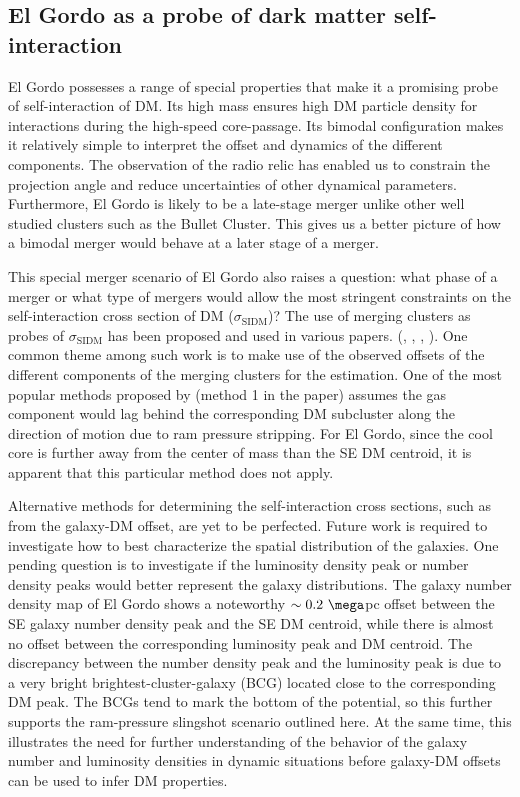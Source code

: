 \subsection{El Gordo as a probe of dark matter self-interaction}
El Gordo possesses a range of special properties that make it a promising
probe of self-interaction of DM. Its high mass ensures high DM
particle density for interactions during the high-speed core-passage. Its bimodal configuration makes it
relatively simple to interpret the offset and dynamics of the different
components. The observation of the radio relic has enabled us to
constrain the projection angle and reduce uncertainties of other dynamical
parameters. Furthermore, El Gordo is likely to be a late-stage merger
unlike other well studied clusters such as the Bullet Cluster. This gives
us a better picture of how a bimodal merger would behave at a later stage of a merger. \par 
This special merger scenario of El Gordo also raises a question: what phase
of a merger or what type of mergers would allow the most stringent
constraints on the self-interaction cross section of DM ($\sigma_{\text{SIDM}}$)? 
The use of merging clusters as probes of $\sigma_{\text{SIDM}}$ 
has been proposed and used in various papers.
(\citealt{Markevitch2004}, \citealt{Randall2008d}, \citealt{Merten2011},
\citealt{Dawson12}). One common theme among such work is
to make use of the observed offsets of the different components of the
merging clusters for the estimation. One of the most popular methods proposed by
\citealt{Markevitch2004} (method 1 in the paper) assumes the gas component would lag behind the corresponding DM
subcluster along the direction of motion due to ram pressure stripping.   
For El Gordo, since the cool core is further away from the
center of mass than the SE DM centroid, it is apparent that this particular
method does not apply.\par 
Alternative methods for determining the self-interaction cross sections,
such as from the galaxy-DM offset, are yet to be perfected. Future work is
required to investigate how to best characterize the spatial distribution
of the galaxies. One pending question is to investigate if the luminosity
density peak or number density peaks would better represent the galaxy
distributions. The galaxy number density map of El Gordo
 shows a noteworthy $\sim0.2~\mega$pc offset between the SE
galaxy number density peak and the SE DM centroid, while there is almost no offset
between the corresponding luminosity peak and DM centroid. The discrepancy
between the number density peak and the luminosity peak is due to a very
bright brightest-cluster-galaxy (BCG) located close to the corresponding DM peak.
The BCGs tend to mark the bottom of the potential, so this further supports the
ram-pressure slingshot scenario outlined here. At the same time, this
illustrates the need for further understanding of the behavior of the
galaxy number and luminosity densities in dynamic situations before
galaxy-DM offsets can be used to infer DM properties. 
\par 
